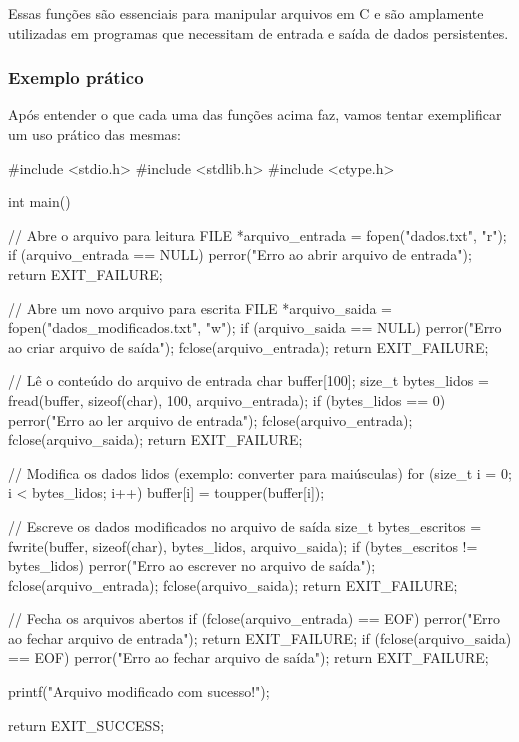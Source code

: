 Essas funções são essenciais para manipular arquivos em C e são amplamente 
utilizadas em programas que necessitam de entrada e saída de dados persistentes.

\subsubsection{Exemplo prático}

Após entender o que cada uma das funções acima faz, vamos tentar exemplificar um uso prático das mesmas:

\begin{excode}
    #include <stdio.h>
    #include <stdlib.h>
    #include <ctype.h>

    int main() {
        // Abre o arquivo para leitura
        FILE *arquivo_entrada = fopen("dados.txt", "r");
        if (arquivo_entrada == NULL) {
            perror("Erro ao abrir arquivo de entrada");
            return EXIT_FAILURE;
        }

        // Abre um novo arquivo para escrita
        FILE *arquivo_saida = fopen("dados_modificados.txt", "w");
        if (arquivo_saida == NULL) {
            perror("Erro ao criar arquivo de saída");
            fclose(arquivo_entrada);
            return EXIT_FAILURE;
        }

        // Lê o conteúdo do arquivo de entrada
        char buffer[100];
        size_t bytes_lidos = fread(buffer, sizeof(char), 100, arquivo_entrada);
        if (bytes_lidos == 0) {
            perror("Erro ao ler arquivo de entrada");
            fclose(arquivo_entrada);
            fclose(arquivo_saida);
            return EXIT_FAILURE;
        }

        // Modifica os dados lidos (exemplo: converter para maiúsculas)
        for (size_t i = 0; i < bytes_lidos; i++) {
            buffer[i] = toupper(buffer[i]);
        }

        // Escreve os dados modificados no arquivo de saída
        size_t bytes_escritos = fwrite(buffer, sizeof(char), bytes_lidos, arquivo_saida);
        if (bytes_escritos != bytes_lidos) {
            perror("Erro ao escrever no arquivo de saída");
            fclose(arquivo_entrada);
            fclose(arquivo_saida);
            return EXIT_FAILURE;
        }

        // Fecha os arquivos abertos
        if (fclose(arquivo_entrada) == EOF) {
            perror("Erro ao fechar arquivo de entrada");
            return EXIT_FAILURE;
        }
        if (fclose(arquivo_saida) == EOF) {
            perror("Erro ao fechar arquivo de saída");
            return EXIT_FAILURE;
        }

        printf("Arquivo modificado com sucesso!\n");

        return EXIT_SUCCESS;
    }
\end{excode}

